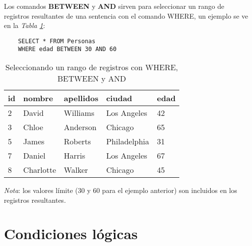 Los comandos \textbf{BETWEEN} y \textbf{AND} sirven para seleccionar un rango de registros resultantes de una sentencia con el comando WHERE, un ejemplo se ve en la \textit{Tabla \ref{tab: 10}}:
\begin{lstlisting}
    SELECT * FROM Personas
    WHERE edad BETWEEN 30 AND 60
\end{lstlisting}
\begin{table}[H]
    \centering
    \caption{Seleccionando un rango de registros con WHERE, BETWEEN y AND}
    \label{tab: 10}
    \begin{tabular}{|l|l|l|l|l|}
        \hline
        \textbf{id} & \textbf{nombre} & \textbf{apellidos} & \textbf{ciudad} & \textbf{edad} \\
        \hline
        2 & David       & Williams  & Los Angeles   & 42 \\
        \hline
        3 & Chloe       & Anderson  & Chicago       & 65 \\
        \hline
        5 & James       & Roberts   & Philadelphia  & 31 \\
        \hline
        7 & Daniel      & Harris    & Los Angeles   & 67 \\
        \hline
        8 & Charlotte   & Walker    & Chicago       & 45 \\
        \hline
    \end{tabular}
\end{table}

\textit{Nota}: los valores límite (30 y 60 para el ejemplo anterior) son incluidos en los registros resultantes.



\section{Condiciones lógicas}

